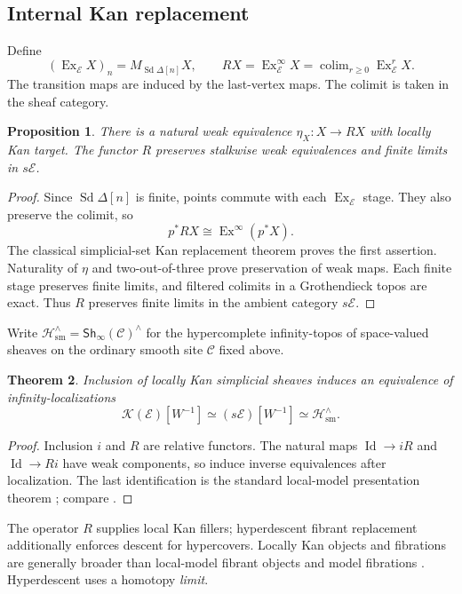 \documentclass[12pt]{amsart}
\newtheorem{thm}{Theorem}[section]
\newtheorem{prop}[thm]{Proposition}
\theoremstyle{definition}
\theoremstyle{remark}
\numberwithin{equation}{section}
\newcommand{\CC}{\mathcal C}
\newcommand{\E}{\mathcal E}
\newcommand{\Hsm}{\mathcal H_{\mathrm{sm}}^\wedge}
\newcommand{\KSh}{\mathcal K(\E)}
\newcommand{\Sh}{\mathsf{Sh}}
\DeclareMathOperator{\Ex}{Ex}
\DeclareMathOperator{\Sd}{Sd}
\DeclareMathOperator{\id}{Id}
\DeclareMathOperator*{\colim}{colim}
\begin{document}
\subsection{Internal Kan replacement}

Define
\[
 (\Ex_\E X)_n=M_{\Sd\Delta[n]}X,\qquad
 RX=\Ex^\infty_\E X=\colim_{r\ge0}\Ex_\E^rX.
\]
The transition maps are induced by the last-vertex maps.
The colimit is taken in the sheaf category.

\begin{prop}\label{prop:internal-ex}
There is a natural weak equivalence $\eta_X:X\to RX$
with locally Kan target. The functor $R$ preserves
stalkwise weak equivalences and finite limits in $s\E$.
\end{prop}

\begin{proof}
Since $\Sd\Delta[n]$ is finite, points commute with
each $\Ex_\E$ stage. They also preserve the colimit, so
\[
 p^*RX\cong\Ex^\infty(p^*X).
\]
The classical simplicial-set Kan replacement theorem
proves the first assertion. Naturality of $\eta$ and
two-out-of-three prove preservation of weak maps.
Each finite stage preserves finite limits, and filtered
colimits in a Grothendieck topos are exact. Thus $R$
preserves finite limits in the ambient category $s\E$.
\end{proof}

Write $\Hsm=\Sh_\infty(\CC)^\wedge$ for the hypercomplete
infinity-topos of space-valued sheaves on the ordinary smooth site
$\CC$ fixed above.
\begin{thm}\label{thm:smooth-localization}
Inclusion of locally Kan simplicial sheaves induces an
equivalence of infinity-localizations
\[
 \KSh[W^{-1}]\simeq(s\E)[W^{-1}]
 \simeq\Hsm.
\]
\end{thm}

\begin{proof}
Inclusion $i$ and $R$ are relative functors. The natural
maps $\id\to iR$ and $\id\to Ri$ have weak components,
so induce inverse equivalences after localization.
The last identification is the standard local-model
presentation theorem
\cite[Observation~3.77 and Proposition~4.18]{NSS2015};
compare \cite[Theorem~6.2]{DHI2004}.
\end{proof}

The operator $R$ supplies local Kan fillers; hyperdescent
fibrant replacement additionally enforces descent for
hypercovers. Locally Kan objects and fibrations
are generally broader than local-model fibrant objects
and model fibrations \cite[Remark~3.56]{NSS2015}.
Hyperdescent uses a homotopy \emph{limit}.
\end{document}

